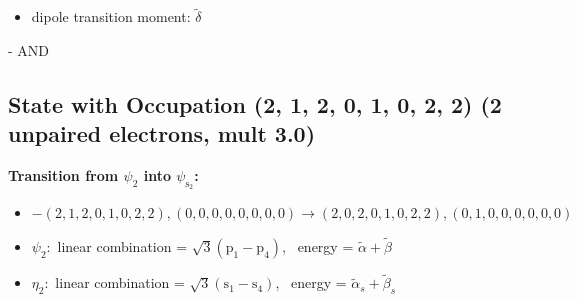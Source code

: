 \documentclass[12pt,a4paper]{article}
\begin{document}
\begin{itemize}
            \item dipole transition moment: $\tilde{\delta}$
        
        \end{itemize}
        
 -  AND 
\subsection*{State with Occupation (2, 1, 2, 0, 1, 0, 2, 2) (2 unpaired electrons, mult 3.0)}
        \noindent\textbf{Transition from $\psi_{2}$ into $\psi_{\text{s}_{2}}$:}
        \begin{itemize}
            \item $- (2, 1, 2, 0, 1, 0, 2, 2), (0, 0, 0, 0, 0, 0, 0, 0) \rightarrow (2, 0, 2, 0, 1, 0, 2, 2), (0, 1, 0, 0, 0, 0, 0, 0)$
        
            \item $\psi_{2}:$ linear combination = $\sqrt{3} \left(\text{p}_{1} - \text{p}_{4}\right)$, \
            energy = $\tilde{\alpha} + \tilde{\beta}$
            
            \item $\eta_{2}:$ linear combination = $\sqrt{3} \left(\text{s}_{1} - \text{s}_{4}\right)$, \
            energy = $\tilde{\alpha}_{s} + \tilde{\beta}_{s}$
            

\end{itemize}
\end{document}
